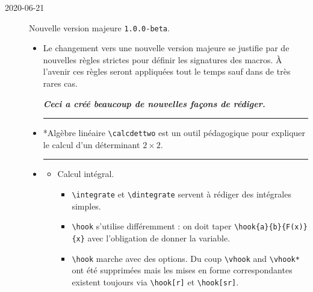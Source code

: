 \documentclass[12pt,a4paper]{book}
\makeatletter
\newcommand\env[1]{\texttt{#1}}
\newcommand\macro[1]{\env{\textbackslash{}#1}}
\theoremstyle{definition}
\newcommand\separation{
	\medskip
	\hfill\rule{0.5\textwidth}{0.75pt}\hfill
	\medskip
}
\newcommand\topic{\@ifstar{\@topic@star}{\@topic@no@star}}
\newcommand\@topic@no@star[1]{%
	\textbf{\textsc{#1}.}%
}
\newcommand\@topic@star[1]{%
	\textbf{\textsc{#1} :}%
}
\makeatother
\begin{document}
{{\begin{description}    \item[2020-06-21] Nouvelle version majeure \verb+1.0.0-beta+.
    
    \begin{itemize}[itemsep=.5em]
        \item Le changement vers une nouvelle version majeure se justifie par de nouvelles règles strictes pour définir les signatures des macros. À l'avenir ces règles seront appliquées tout le temps sauf dans de très rares cas.
        \begin{center}
    		\bfseries\itshape
    		Ceci a créé beaucoup de nouvelles façons de rédiger.
        \end{center}
    
    
    
    
    
        \separation
        \item \topic*{Algèbre linéaire}
              \macro{calcdettwo} est un outil pédagogique pour expliquer le calcul d'un déterminant $2\times2$.
    
    
    
    
        \separation
        \item \topic{Analyse}
        \begin{itemize}[itemsep=.5em]
            \item Calcul intégral.
            
            \begin{itemize}[itemsep=.5em, label=$\rightarrow$]
                \item \macro{integrate} et \macro{dintegrate} servent à rédiger des intégrales simples.
    
                \item \macro{hook} s'utilise différemment : on doit taper \macro{hook\{a\}\{b\}\{F(x)\}\{x\}} avec l'obligation de donner la variable.
                
                \item \macro{hook} marche avec des options.
                      Du coup \macro{vhook} and \macro{vhook*} ont été supprimées mais les mises en forme correspondantes existent toujours via \macro{hook[r]} et \macro{hook[sr]}.
    	    \end{itemize}
    	    
            

\end{itemize}
\end{itemize}
\end{description}}}
\end{document}
